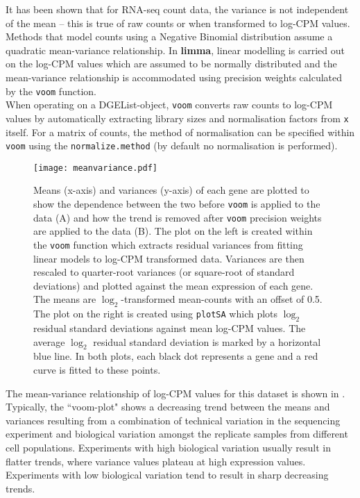 \documentclass[10pt,a4paper]{extarticle}\usepackage[]{graphicx}\usepackage[]{color}
\begin{document}
It has been shown that for RNA-seq count data, the variance is not independent of the mean \cite{Law:GenomeBiol:2014} -- this is true of raw counts or when transformed to log-CPM values. Methods that model counts using a Negative Binomial distribution assume a quadratic mean-variance relationship. In \textbf{limma}, linear modelling is carried out on the log-CPM values which are assumed to be normally distributed and the mean-variance relationship is accommodated using precision weights calculated by the \texttt{voom} function.\\

When operating on a DGEList-object, \texttt{voom} converts raw counts to log-CPM values by automatically extracting library sizes and normalisation factors from \texttt{x} itself. For a matrix of counts, the method of normalisation can be specified within \texttt{voom} using the  \texttt{normalize.method} (by default no normalisation is performed).\\

\begin{figure}
\centering
\texttt{[image: meanvariance.pdf]}
\caption{\label{fig:voom}Means (x-axis) and variances (y-axis) of each gene are plotted to show the dependence between the two before \texttt{voom} is applied to the data (A) and how the trend is removed after \texttt{voom} precision weights are applied to the data (B). The plot on the left is created within the \texttt{voom} function which extracts residual variances from fitting linear models to log-CPM transformed data. Variances are then rescaled to quarter-root variances (or square-root of standard deviations) and plotted against the mean expression of each gene. The means are $\log_2$-transformed mean-counts with an offset of 0.5. The plot on the right is created using \texttt{plotSA} which plots $\log_2$ residual standard deviations against mean log-CPM values. The average $\log_2$ residual standard deviation is marked by a horizontal blue line. In both plots, each black dot represents a gene and a red curve is fitted to these points.}
\end{figure}

The mean-variance relationship of log-CPM values for this dataset is shown in {}. Typically, the ``voom-plot" shows a decreasing trend between the means and variances resulting from a combination of technical variation in the sequencing experiment and biological variation amongst the replicate samples from different cell populations.
Experiments with high biological variation usually result in flatter trends, where variance values plateau at high expression values. 
Experiments with low biological variation tend to result in sharp decreasing trends.\\ 
\end{document}
